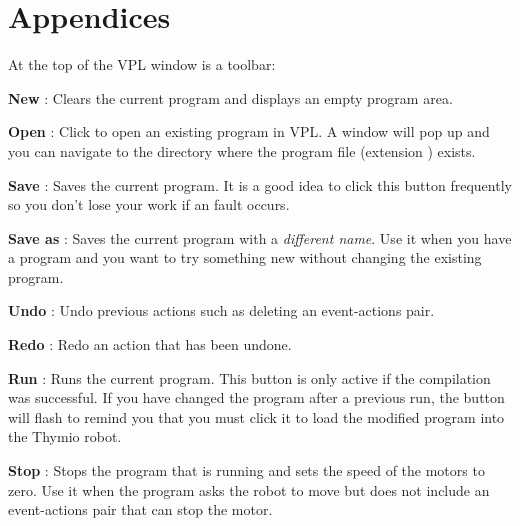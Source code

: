 \part{Appendices}

\label{a.toolbar}

At the top of the VPL window is a toolbar:

\begin{center}
\end{center}

\bigskip

\textbf{New} : Clears the current program and displays an
empty program area.

\bigskip

\textbf{Open} : Click to open an existing program in VPL. A
window will pop up and you can navigate to the directory where the
program file (extension ) exists.

\bigskip

\textbf{Save} : Saves the current program. It is a good idea
to click this button frequently so you don't lose your work if an fault
occurs.

\bigskip

\textbf{Save as} : Saves the current program with a
\emph{different name}. Use it when you have a program and you want to
try something new without changing the existing program.

\bigskip

\textbf{Undo} : Undo previous actions such as deleting
an event-actions pair.\label{p.undo}

\bigskip

\textbf{Redo} : Redo an action that has been undone.

\bigskip

\textbf{Run} : Runs the current program. This button is only
active if the compilation was successful. If you have changed the
program after a previous run, the button will flash to remind you that
you must click it to load the modified program into the Thymio robot.

\bigskip

\textbf{Stop} : Stops the program that is running and sets
the speed of the motors to zero. Use it when the program asks the robot
to move but does not include an event-actions pair that can stop the
motor.

\bigskip

